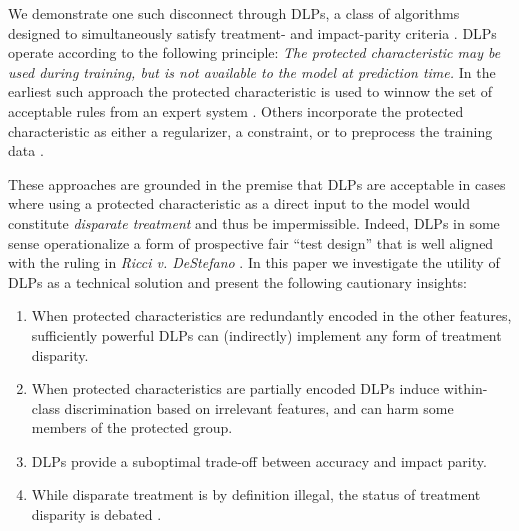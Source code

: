 
We demonstrate one such disconnect
through DLPs,
a class of algorithms designed 
to simultaneously satisfy
treatment- and impact-parity criteria \cite{pedreshi2008discrimination,kamishima2011fairness,zafar2017fairness}.   
DLPs operate according to the following principle:
\emph{The protected characteristic may be used during training, but is not available to the model at prediction time.}
In the earliest such approach
the protected characteristic is used
to winnow the set of acceptable rules 
from an expert system \cite{pedreshi2008discrimination}.
Others incorporate the protected characteristic 
as either a regularizer, 
a constraint, 
or to preprocess the training data   \citep{kamiran2009classifying,kamiran2010discrimination,zafar2017fairness}.

These approaches are grounded in the premise 
that DLPs are acceptable in cases 
where using a protected characteristic 
as a direct input to the model
would constitute \emph{disparate treatment}
and thus be impermissible.  Indeed, DLPs in some sense operationalize a form of prospective fair ``test design'' that is well aligned with the ruling in \textit{Ricci v. DeStefano} \cite{kim2017auditing}.  
In this paper we investigate the utility of DLPs as a technical solution
and present the following cautionary insights:
\begin{enumerate}
\item When protected characteristics 
are redundantly encoded in the other features, 
sufficiently powerful DLPs 
can (indirectly) implement any form of treatment disparity.
\item When protected characteristics are partially encoded
DLPs induce within-class discrimination 
based on irrelevant features,
and can harm some members of the protected group. 
\item DLPs provide a suboptimal trade-off 
between accuracy and impact parity. 
\item While disparate treatment is by definition illegal, 
the status of treatment disparity is debated \citep{kim2017data}.
\end{enumerate}

